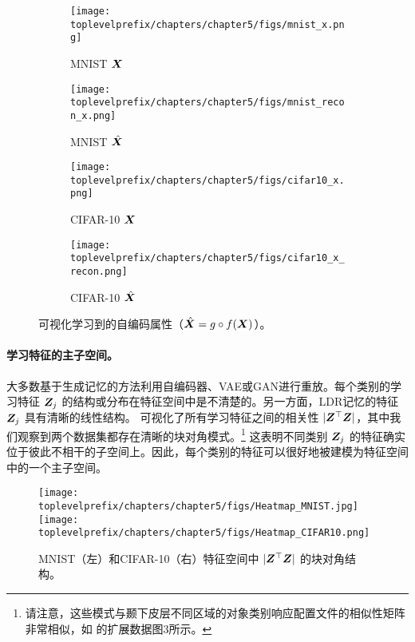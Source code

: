 \documentclass[../../book-main_zh.tex]{subfiles}
\begin{document}
\begin{figure}[t]
    \begin{subfigure}[t]{0.20\textwidth}
        \centering
        \texttt{[image: \\toplevelprefix/chapters/chapter5/figs/mnist\_x.png]}
        \caption{MNIST $\bm{X}$}
    \end{subfigure}
    \hfill
    \begin{subfigure}[t]{0.20\textwidth}
        \centering
        \texttt{[image: \\toplevelprefix/chapters/chapter5/figs/mnist\_recon\_x.png]}
        \caption{MNIST $\hat{\bm{X}}$}
    \end{subfigure}
    \hfill
    \begin{subfigure}[t]{0.20\textwidth}
        \centering
        \texttt{[image: \\toplevelprefix/chapters/chapter5/figs/cifar10\_x.png]}
        \caption{CIFAR-10 $\bm{X}$}
    \end{subfigure}
    \hfill
    \begin{subfigure}[t]{0.20\textwidth}
        \centering
        \texttt{[image: \\toplevelprefix/chapters/chapter5/figs/cifar10\_x\_recon.png]}
        \caption{CIFAR-10 $\hat{\bm{X}}$}
    \end{subfigure}
    \caption{\small 可视化学习到的自编码属性（$\hat{\bm{X}} = g\circ f(\bm{X})$）。}
        \label{fig:justify_xhat_equals_x_incremental}
\end{figure}


\paragraph{学习特征的主子空间。}
大多数基于生成记忆的方法利用自编码器、VAE或GAN进行重放。每个类别的学习特征 $\bm{Z}_j$ 的结构或分布在特征空间中是不清楚的。另一方面，LDR记忆的特征 $\bm{Z}_j$ 具有清晰的线性结构。  可视化了所有学习特征之间的相关性 $|\bm{Z}^\top\bm{Z}|$，其中我们观察到两个数据集都存在清晰的块对角模式。\footnote{请注意，这些模式与颞下皮层不同区域的对象类别响应配置文件的相似性矩阵非常相似，如 \cite{Bao2020AMO} 的扩展数据图3所示。} 这表明不同类别 $\bm{Z}_j$ 的特征确实位于彼此不相干的子空间上。因此，每个类别的特征可以很好地被建模为特征空间中的一个主子空间。

\begin{figure}[tb]
\centering
\texttt{[image: \\toplevelprefix/chapters/chapter5/figs/Heatmap\_MNIST.jpg]}  
\texttt{[image: \\toplevelprefix/chapters/chapter5/figs/Heatmap\_CIFAR10.png]}
\caption{\small MNIST（左）和CIFAR-10（右）特征空间中 $|\bm{Z}^\top \bm{Z}|$ 的块对角结构。}
\label{fig:cifar_10_pca_sampling_main}
\end{figure}
\end{document}
